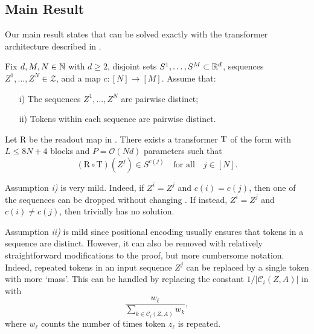 \documentclass[11pt,a4paper]{amsart}
\begin{document}
\subsection{Main Result}\label{sec:main-thm}
Our main result states that  can be solved exactly with the transformer architecture described in .
\begin{theorem}\label{thm:mainResult}
    Fix $d,M,N \in \mathbb{N}$ with $d\geq 2$, disjoint sets $\smash{S^1,\ldots,S^M} \subset \mathbb{R}^d$, sequences $Z^1,\ldots,Z^N \in \mathcal{Z}$,  and a map $c : [N] \to [M]$. Assume that:
    \begin{enumerate}[noitemsep, topsep=0pt]
    \item[i)] The sequences $Z^1,\ldots, Z^N$ are pairwise distinct;
    \item[ii)] Tokens within each sequence are pairwise distinct.
    \end{enumerate}
Let $\mathrm{R}$ be the readout map in . There exists a transformer $\operatorname{\mathrm{T}}$ of the form  with $L \leq 8N + 4$ blocks and $P = \mathcal{O}(Nd)$ parameters such that
\begin{equation}
    \left( \mathrm{R} \circ \mathrm{T} \right)(Z^j) \in S^{c(j)}\quad \text{for all}\quad j \in [N].
\end{equation}
\end{theorem}
\begin{remark}
    Assumption \textit{i)} is very mild. Indeed, if $Z^i=Z^j$ and $c(i) = c(j)$, then one of the sequences can be dropped without changing . If instead, $Z^i=Z^j$ and $c(i) \neq c(j)$, then  trivially has no solution.
\end{remark}
\begin{remark}
    Assumption \textit{ii)} is mild since positional encoding \cite{press2022trainshorttestlong} usually ensures that tokens in a sequence are distinct. However, it can also be removed with relatively straightforward modifications to the proof, but more cumbersome notation. Indeed, repeated tokens in an input sequence $Z^j$ can be replaced by a single token with more `mass'. This can be handled by replacing the constant $1/|\mathcal{C}_i(Z,A)|$ in  with 
    \begin{equation}
    \frac{w_\ell}{\sum_{k \in \mathcal{C}_i(Z,A)} w_k},
    \end{equation}
    where $w_\ell$ counts the number of times token $z_\ell$ is repeated.
\end{remark}
\end{document}

